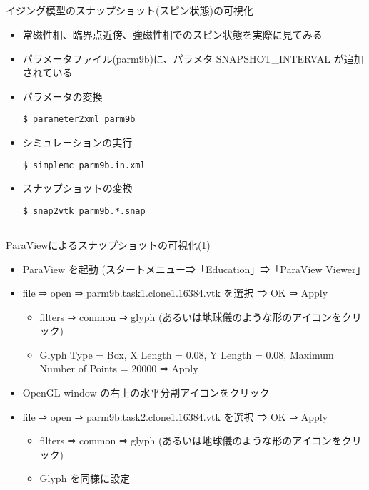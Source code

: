 \subsection*{\redb\whiteb\greenm}
\begin{frame}[t,fragile]{イジング模型のスナップショット(スピン状態)の可視化}
  \begin{itemize}
  \item 常磁性相、臨界点近傍、強磁性相でのスピン状態を実際に見てみる
  \item パラメータファイル(parm9b)に、パラメタ SNAPSHOT\_INTERVAL が追加されている
  \item パラメータの変換
\begin{lstlisting}
$ parameter2xml parm9b
\end{lstlisting}
  \item シミュレーションの実行
\begin{lstlisting}
$ simplemc parm9b.in.xml
\end{lstlisting}
\item スナップショットの変換
\begin{lstlisting}
$ snap2vtk parm9b.*.snap
\end{lstlisting}
  \end{itemize}
\end{frame}

\subsection*{\redb\whiteb\greenm}
\begin{frame}[t,fragile]{ParaViewによるスナップショットの可視化(1)}
  \begin{itemize}
  \item ParaView を起動 (スタートメニュー⇒「Education」⇒「ParaView Viewer」
  \item file ⇒ open ⇒ parm9b.task1.clone1.16384.vtk を選択 ⇒ OK ⇒ Apply
    \begin{itemize}
    \item filters ⇒ common ⇒ glyph (あるいは地球儀のような形のアイコンをクリック)
    \item Glyph Type = Box, X Length = 0.08, Y Length = 0.08, Maximum Number of Points = 20000 ⇒ Apply
    \end{itemize}
  \item OpenGL window の右上の水平分割アイコンをクリック
  \item file ⇒ open ⇒ parm9b.task2.clone1.16384.vtk を選択 ⇒ OK ⇒ Apply
    \begin{itemize}
    \item filters ⇒ common ⇒ glyph (あるいは地球儀のような形のアイコンをクリック)
    \item Glyph を同様に設定
    \end{itemize}
  \end{itemize}
\end{frame}

